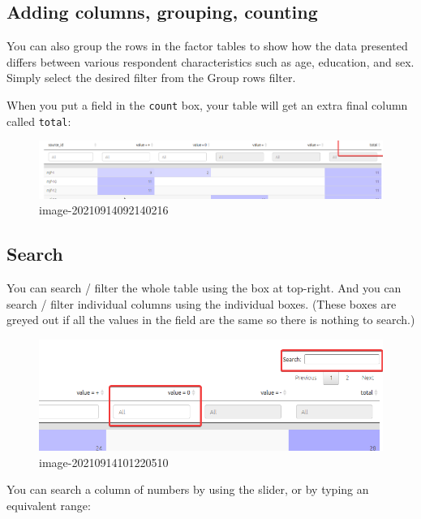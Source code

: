 \documentclass[
]{book}
\begin{document}
\hypertarget{adding-columns-grouping-counting}{%
\subsection{Adding columns, grouping, counting}\label{adding-columns-grouping-counting}}

You can also group the rows in the factor tables to show how the data presented differs between various respondent characteristics such as age, education, and sex. Simply select the desired filter from the Group rows filter.

When you put a field in the \texttt{count} box, your table will get an extra final column called \texttt{total}:

\begin{figure}
\centering
\includegraphics[width=6.77083in,height=\textheight]{_assets/image-20210914092140216.png}
\caption{image-20210914092140216}
\end{figure}

\hypertarget{search}{%
\subsection{Search}\label{search}}

You can search / filter the whole table using the box at top-right. And you can search / filter individual columns using the individual boxes. (These boxes are greyed out if all the values in the field are the same so there is nothing to search.)

\begin{figure}
\centering
\includegraphics[width=6.77083in,height=\textheight]{_assets/image-20210914101220510.png}
\caption{image-20210914101220510}
\end{figure}

You can search a column of numbers by using the slider, or by typing an equivalent range:
\end{document}
